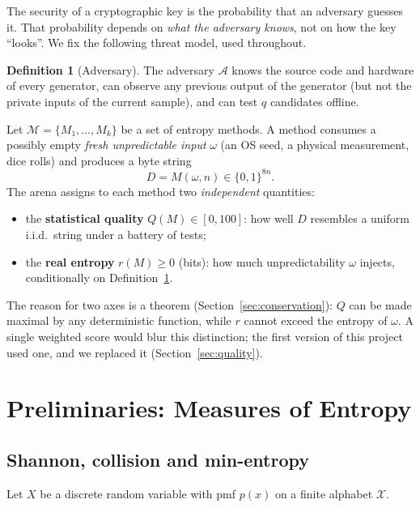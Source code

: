 \documentclass[11pt,a4paper]{article}
\theoremstyle{plain}
\theoremstyle{definition}
\newtheorem{definition}[theorem]{Definition}
\begin{document}
The security of a cryptographic key is the probability that an adversary
guesses it. That probability depends on \emph{what the adversary knows}, not on
how the key ``looks''. We fix the following threat model, used throughout.

\begin{definition}[Adversary]\label{def:adv}
The adversary $\mathcal{A}$ knows the source code and hardware of every
generator, can observe any previous output of the generator (but not the
private inputs of the current sample), and can test $q$ candidates offline.
\end{definition}

Let $\mathcal{M}=\{M_1,\dots,M_k\}$ be a set of entropy methods. A method
consumes a possibly empty \emph{fresh unpredictable input} $\omega$ (an OS
seed, a physical measurement, dice rolls) and produces a byte string
\begin{equation}
    D = M(\omega, n) \in \{0,1\}^{8n}.
\end{equation}
The arena assigns to each method two \emph{independent} quantities:
\begin{itemize}[leftmargin=1.4em]
    \item the \textbf{statistical quality} $Q(M)\in[0,100]$: how well $D$
          resembles a uniform i.i.d.\ string under a battery of tests;
    \item the \textbf{real entropy} $r(M)\ge 0$ (bits): how much unpredictability
          $\omega$ injects, conditionally on Definition~\ref{def:adv}.
\end{itemize}
The reason for two axes is a theorem (Section~\ref{sec:conservation}): $Q$ can
be made maximal by any deterministic function, while $r$ cannot exceed the
entropy of $\omega$. A single weighted score would blur this distinction; the
first version of this project used one, and we replaced it (Section~\ref{sec:quality}).

\section{Preliminaries: Measures of Entropy}

\subsection{Shannon, collision and min-entropy}

Let $X$ be a discrete random variable with pmf $p(x)$ on a finite alphabet
$\mathcal{X}$.
\end{document}
